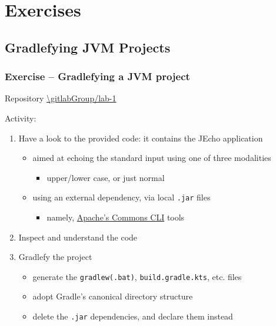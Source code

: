 \documentclass[presentation]{beamer}\mode<presentation>{\usetheme{AMSBolognaFC}}
\begin{document}
\section{Exercises}

\subsection{Gradlefying JVM Projects}

\startExercise

\begin{frame}[allowframebreaks]
	\frametitle{Exercise \currentExercise{} -- Gradlefying a JVM project}

	\begin{block}{Repository}\centering
		\url{\gitlabGroup/lab-1}
	\end{block}

	\bigskip

	Activity:
	\medskip
	\begin{enumerate}
		\item Have a look to the provided code: it contains the \alert{JEcho} application
		\begin{itemize}
			\item aimed at echoing the standard input using one of \alert{three modalities}
			\begin{itemize}
				\item upper/lower case, or just normal
			\end{itemize}
			\item using an external dependency, via local \texttt{.jar} files
			\begin{itemize}
				\item namely, \href{https://commons.apache.org/proper/commons-cli/}{Apache's Commons CLI} tools
			\end{itemize}
		\end{itemize}

		\medskip

		\item Inspect and understand the code

		\framebreak

		\item Gradlefy the project
		\begin{itemize}
			\item generate the \texttt{gradlew(.bat)}, \texttt{build.gradle.kts}, etc. files
			\item adopt Gradle's canonical directory structure
			\item delete the \texttt{.jar} dependencies, and declare them instead
		\end{itemize}


\end{enumerate}
\end{frame}
\end{document}
